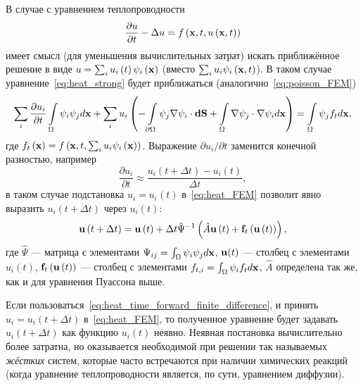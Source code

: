 \documentclass[oneside,final,12pt]{extreport}
\begin{document}
В случае с уравнением теплопроводности
\begin{equation}
  \frac{\partial u}{\partial t} - \Delta u =
    f\left(\vb x, t, u\left(\vb x, t\right)\right)
\label{eq:heat_strong}
\end{equation}
имеет смысл (для уменьшения вычислительных затрат)
искать приближённое решение в виде
$u = \sum_i u_i\left(t\right)\psi_i\left(\vb x\right)$
(вместо $\sum_i u_i\psi_i\left(\vb x, t\right)$).
В таком случае уравнение~\eqref{eq:heat_strong} будет приближаться
(аналогично~\eqref{eq:poisson_FEM})
\begin{equation}
  \sum_i \frac{\partial u_i}{\partial t} \int\limits_\Omega \psi_i\psi_j d\vb x +
    \sum_i u_i \left(
      -\int\limits_{\partial\Omega} \psi_j \nabla \psi_i \cdot \vb{dS} +
      \int\limits_\Omega \nabla\psi_j \cdot \nabla \psi_i d\vb x
    \right) =
  \int\limits_\Omega \psi_j f_t d\vb x,
\label{eq:heat_FEM}
\end{equation}
где $f_t\left(\vb x\right) =
  f\left(\vb x, t, \sum_i u_i\psi_i\left(\vb x\right)\right)$.
Выражение $\partial u_i/\partial t$ заменится конечной разностью, например
\begin{equation}
  \frac{\partial u_i}{\partial t} \approx
    \frac{u_i\left(t + \Delta t\right) - u_i\left(t\right)}{\Delta t},
\label{eq:heat_time_forward_finite_difference}
\end{equation}
в таком случае подстановка $u_i = u_i\left(t\right)$ в~\eqref{eq:heat_FEM}
позволит явно выразить $u_i\left(t + \Delta t\right)$ через $u_i\left(t\right)$:
\begin{equation}
  \vb u\left(t + \Delta t\right) =
    \vb u\left(t\right) +
      \Delta t\hat{\Psi}^{-1} \left(\hat{A}\vb u\left(t\right) +
                                    \vb f_t\left(\vb u\left(t\right)\right)\right),
\label{eq:heat_FEM_explicit}
\end{equation}
где $\hat{\Psi}$ --- матрица с элементами $\Psi_{ij} = \int_\Omega\psi_i\psi_j d\vb x$,
$\vb u(t)$ --- столбец с элементами $u_i\left(t\right)$,
$\vb f_t\left(\vb u\left(t\right)\right)$ ---
  столбец с элементами $f_{t,i} = \int_\Omega\psi_i f_t d\vb x$,
$\hat{A}$ определена так же, как и для уравнения Пуассона выше.

Если пользоваться~\eqref{eq:heat_time_forward_finite_difference},
и принять $u_i = u_i(t + \Delta t)$ в~\eqref{eq:heat_FEM},
то полученное уравнение будет задавать
$u_i\left(t + \Delta t\right)$ как функцию $u_i\left(t\right)$ неявно.
Неявная постановка вычислительно более затратна, но
оказывается необходимой при решении так называемых \emph{жёстких} систем,
которые часто встречаются при наличии химических реакций
(когда уравнение теплопроводности является, по сути, уравнением диффузии).
\end{document}
